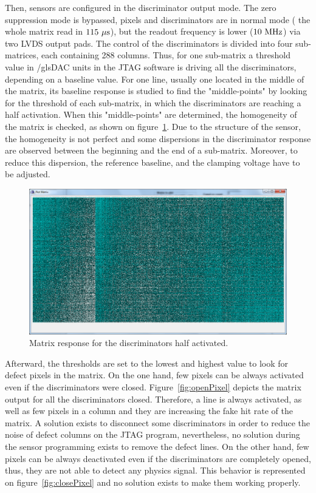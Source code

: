   Then, sensors are configured in the discriminator output mode.
  The zero suppression mode is bypassed, pixels and discriminators are in normal mode ( the whole matrix read in $115~\mu\rm{s}$), but the readout frequency is lower ($10~\rm{MHz}$) via two \gls{LVDS} output pads.
  The control of the discriminators is divided into four sub-matrices, each containing 288 columns.
  Thus, for one sub-matrix a threshold value in /gls{DAC} units in the \gls{JTAG} software is driving all the discriminators, depending on a baseline value.
  For one line, usually one located in the middle of the matrix, its baseline response is studied to find the "middle-points" by looking for the threshold of each sub-matrix, in which the discriminators are reaching a half activation.
  When this "middle-points" are determined, the homogeneity of the matrix is checked, as shown on figure~\ref{fig:homogeneityMi26}.
  Due to the structure of the sensor, the homogeneity is not perfect and some dispersions in the discriminator response are observed between the beginning and the end of a sub-matrix.
  Moreover, to reduce this dispersion, the reference baseline, and the clamping voltage have to be adjusted.
  
  \begin{figure}[!h]
    \centering
    \includegraphics[width = \textwidth]{Pictures/labTests/discri_middle.png}
    \caption{Matrix response for the discriminators half activated.}
    \label{fig:homogeneityMi26}
  \end{figure}
  
  Afterward, the thresholds are set to the lowest and highest value to look for defect pixels in the matrix.
  On the one hand, few pixels can be always activated even if the discriminators were closed.
  Figure~\ref{fig:openPixel} depicts the matrix output for all the discriminators closed.
  Therefore, a line is always activated, as well as few pixels in a column and they are increasing the fake hit rate of the matrix.
  A solution exists to disconnect some discriminators in order to reduce the noise of defect columns on the \gls{JTAG} program, nevertheless, no solution during the sensor programming exists to remove the defect lines.
  On the other hand, few pixels can be always deactivated even if the discriminators are completely opened, thus, they are not able to detect any physics signal.
  This behavior is represented on figure~\ref{fig:closePixel} and no solution exists to make them working properly.
   
